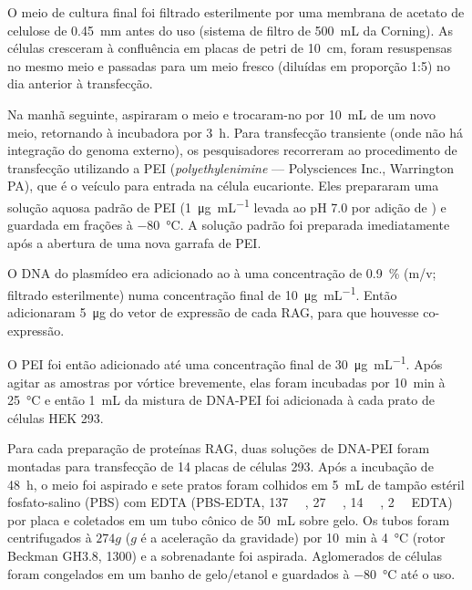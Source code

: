 \documentclass[
	12pt,				%
	openright,			%
	twoside,			%
	a4paper,			%
	]{abntex2}
\begin{document}
O meio de cultura final foi filtrado esterilmente por uma membrana de acetato de celulose de \SI{0.45}{\milli\meter} antes do uso (sistema de filtro de \SI{500}{\milli\liter} da Corning). As células cresceram à confluência em placas de petri de \SI{10}{\centi\meter}, foram resuspensas no mesmo meio e passadas para um meio fresco (diluídas em proporção 1:5) no dia anterior à transfecção.

Na manhã seguinte, aspiraram o meio e trocaram-no por \SI{10}{\milli\liter} de um novo meio, retornando à incubadora por \SI{3}{\hour}. Para transfecção transiente (onde não há integração do genoma externo), os pesquisadores recorreram ao procedimento de transfecção utilizando a PEI (\textit{polyethylenimine} --- Polysciences Inc., Warrington PA), que é o veículo para entrada na célula eucarionte. Eles prepararam uma solução aquosa padrão de PEI (\SI{1}{\micro\gram\per\milli\liter} levada ao pH \num{7.0} por adição de ) e guardada em frações à \SI{-80}{\degreeCelsius}. A solução padrão foi preparada imediatamente após a abertura de uma nova garrafa de PEI.

O DNA do plasmídeo era adicionado ao  à uma concentração de \SI{0.9}{\percent} (m/v; filtrado esterilmente) numa concentração final de \SI{10}{\micro\gram\per\milli\liter}. Então adicionaram \SI{5}{\micro\gram} do vetor de expressão de cada RAG, para que houvesse co-expressão.

O PEI foi então adicionado até uma concentração final de \SI{30}{\micro\gram\per\milli\liter}. Após agitar as amostras por vórtice brevemente, elas foram incubadas por \SI{10}{\minute} à \SI{25}{\degreeCelsius} e então \SI{1}{\milli\liter} da mistura de DNA-PEI foi adicionada à cada prato de células HEK 293.

Para cada preparação de proteínas RAG, duas soluções de DNA-PEI foram montadas para transfecção de 14 placas de células 293. Após a incubação de \SI{48}{\hour}, o meio foi aspirado e sete pratos foram colhidos em \SI{5}{\milli\liter} de tampão estéril fosfato-salino (PBS) com EDTA (PBS-EDTA, \SI{137}{\milli\molar} , \SI{27}{\milli\molar} , \SI{14}{\milli\molar} , \SI{2}{\milli\molar} EDTA) por placa e coletados em um tubo cônico de \SI{50}{\milli\liter} sobre gelo. Os tubos foram centrifugados à $ 274g $ ($ g $ é a aceleração da gravidade) por \SI{10}{\minute} à \SI{4}{\degreeCelsius} (rotor Beckman GH3.8, \SI{1300}{\rpm}) e a sobrenadante foi aspirada. Aglomerados de células foram congelados em um banho de gelo/etanol e guardados à \SI{-80}{\degreeCelsius} até o uso.
\end{document}
